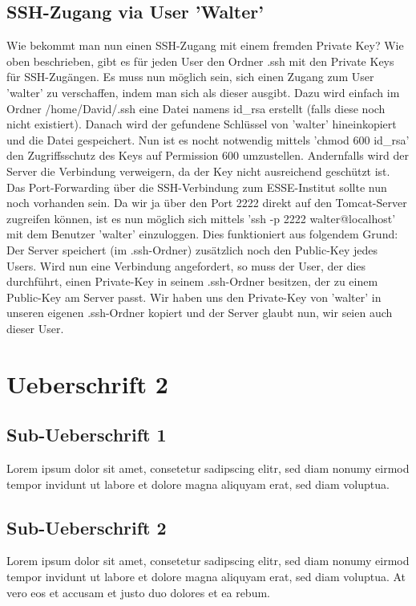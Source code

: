 \documentclass[12pt,a4paper,titlepage,oneside]{scrartcl}
\begin{document}
\subsection{SSH-Zugang via User 'Walter'}
Wie bekommt man nun einen SSH-Zugang mit einem fremden Private Key?
Wie oben beschrieben, gibt es für jeden User den Ordner .ssh mit den Private Keys für SSH-Zugängen. Es muss nun
möglich sein, sich einen Zugang zum User 'walter' zu verschaffen, indem man sich als dieser ausgibt. Dazu
wird einfach im Ordner /home/David/.ssh eine Datei namens id\_rsa erstellt (falls diese noch nicht existiert). Danach wird
der gefundene Schlüssel von 'walter' hineinkopiert und die Datei gespeichert. Nun ist es nocht notwendig mittels 'chmod
600 id\_rsa' den Zugriffsschutz des Keys auf Permission 600 umzustellen. Andernfalls wird der Server die Verbindung
verweigern, da der Key nicht ausreichend geschützt ist. Das Port-Forwarding über die SSH-Verbindung zum ESSE-Institut
sollte nun noch vorhanden sein. Da wir ja über den Port 2222 direkt auf den Tomcat-Server zugreifen können, ist es nun
möglich sich mittels 'ssh -p 2222 walter@localhost' mit dem Benutzer 'walter' einzuloggen. Dies funktioniert aus folgendem
Grund:\linebreak
Der Server speichert (im .ssh-Ordner) zusätzlich noch den Public-Key jedes Users. Wird nun eine Verbindung angefordert,
so muss der User, der dies durchführt, einen Private-Key in seinem .ssh-Ordner besitzen, der zu einem Public-Key am Server passt.
Wir haben uns den Private-Key von 'walter' in unseren eigenen .ssh-Ordner kopiert und der Server glaubt nun, wir seien
auch dieser User. 

\section{Ueberschrift 2}

\subsection{Sub-Ueberschrift 1}
Lorem ipsum dolor sit amet, consetetur sadipscing elitr, sed diam nonumy eirmod tempor invidunt ut labore et dolore magna aliquyam erat, sed diam voluptua. 

\subsection{Sub-Ueberschrift 2}
Lorem ipsum dolor sit amet, consetetur sadipscing elitr, sed diam nonumy eirmod tempor invidunt ut labore et dolore magna aliquyam erat, sed diam voluptua. At vero eos et accusam et justo duo dolores et ea rebum. 
\end{document}
